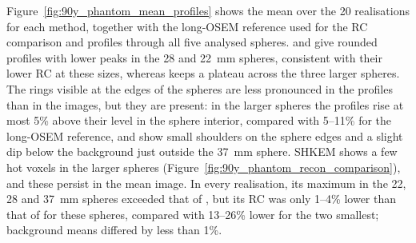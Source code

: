 Figure~\ref{fig:90y_phantom_mean_profiles} shows the mean over the 20 realisations for each method, together with the long-OSEM reference used for the RC comparison and profiles through all five analysed spheres. \dtv and \wtnv give rounded profiles with lower peaks in the 28 and \SI{22}{mm} spheres, consistent with their lower RC at these sizes, whereas \wdtnv keeps a plateau across the three larger spheres. The rings visible at the edges of the \wdtnv spheres are less pronounced in the profiles than in the images, but they are present: in the larger spheres the \wdtnv profiles rise at most 5\% above their level in the sphere interior, compared with 5--11\% for the long-OSEM reference, and show small shoulders on the sphere edges and a slight dip below the background just outside the \SI{37}{mm} sphere. SHKEM shows a few hot voxels in the larger spheres (Figure~\ref{fig:90y_phantom_recon_comparison}), and these persist in the mean image. In every realisation, its maximum in the 22, 28 and \SI{37}{mm} spheres exceeded that of \wdtnv, but its RC was only 1--4\% lower than that of \wdtnv for these spheres, compared with 13--26\% lower for the two smallest; background means differed by less than 1\%.

